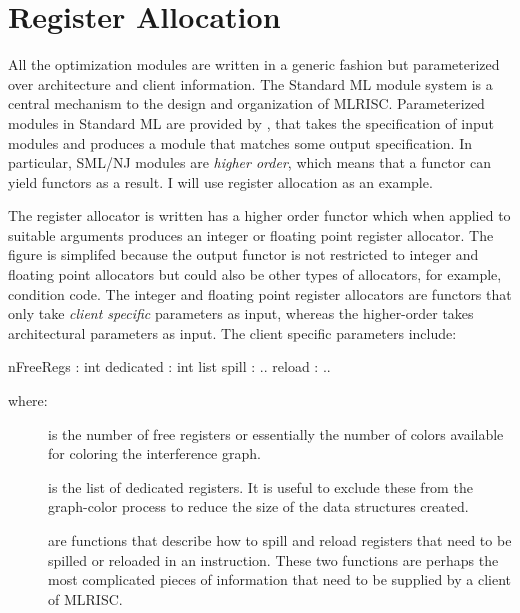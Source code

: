  \section{Register Allocation}
  All the optimization modules are written in a generic fashion but
  parameterized over architecture and client information. The Standard
  ML module system is a central mechanism to the design and
  organization of MLRISC. Parameterized modules in Standard ML are
provided by , that takes the
specification of input modules and produces a module that matches some
output specification. In particular, SML/NJ modules are 
\emph{higher order}, which means that a functor can yield functors as a
result. I will use register allocation as an example.


  The register allocator is written has a higher order functor which
  when applied to suitable arguments produces an integer or floating
  point register allocator. The figure is simplifed because the output
  functor is not restricted to integer and floating point allocators
  but could also be other types of allocators, for example, condition
  code.  The integer and floating point register allocators are
  functors that only take \emph{client specific} parameters as
  input, whereas the higher-order takes architectural parameters as
  input. The client specific parameters include:
\begin{SML}
  nFreeRegs : int
  dedicated : int list
  spill : ..
  reload : ..
\end{SML}

where:
 \begin{description} 
    \item[] is the number of free registers or
    essentially the number of colors available for coloring the
    interference graph.

    \item[] is the list of dedicated registers. It
    is useful to exclude these from the graph-color process to reduce
    the size of the data structures created.

    \item[] are functions that describe how to
    spill and reload registers that need to be spilled or reloaded in
    an instruction. These two functions are perhaps the most
    complicated pieces of information that need to be supplied by a
    client of MLRISC.
\end{description} 

